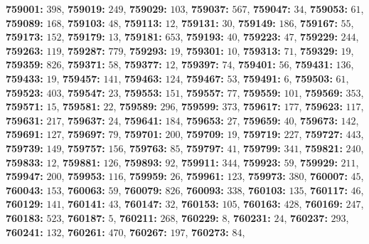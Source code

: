 \textsf{\bfseries 759001:} $398$, \textsf{\bfseries 759019:} $249$, \textsf{\bfseries 759029:} $103$, \textsf{\bfseries 759037:} $567$, \textsf{\bfseries 759047:} $34$, \textsf{\bfseries 759053:} $61$, \textsf{\bfseries 759089:} $168$, \textsf{\bfseries 759103:} $48$, \textsf{\bfseries 759113:} $12$, \textsf{\bfseries 759131:} $30$, \textsf{\bfseries 759149:} $186$, \textsf{\bfseries 759167:} $55$, \textsf{\bfseries 759173:} $152$, \textsf{\bfseries 759179:} $13$, \textsf{\bfseries 759181:} $653$, \textsf{\bfseries 759193:} $40$, \textsf{\bfseries 759223:} $47$, \textsf{\bfseries 759229:} $244$, \textsf{\bfseries 759263:} $119$, \textsf{\bfseries 759287:} $779$, \textsf{\bfseries 759293:} $19$, \textsf{\bfseries 759301:} $10$, \textsf{\bfseries 759313:} $71$, \textsf{\bfseries 759329:} $19$, \textsf{\bfseries 759359:} $826$, \textsf{\bfseries 759371:} $58$, \textsf{\bfseries 759377:} $12$, \textsf{\bfseries 759397:} $74$, \textsf{\bfseries 759401:} $56$, \textsf{\bfseries 759431:} $136$, \textsf{\bfseries 759433:} $19$, \textsf{\bfseries 759457:} $141$, \textsf{\bfseries 759463:} $124$, \textsf{\bfseries 759467:} $53$, \textsf{\bfseries 759491:} $6$, \textsf{\bfseries 759503:} $61$, \textsf{\bfseries 759523:} $403$, \textsf{\bfseries 759547:} $23$, \textsf{\bfseries 759553:} $151$, \textsf{\bfseries 759557:} $77$, \textsf{\bfseries 759559:} $101$, \textsf{\bfseries 759569:} $353$, \textsf{\bfseries 759571:} $15$, \textsf{\bfseries 759581:} $22$, \textsf{\bfseries 759589:} $296$, \textsf{\bfseries 759599:} $373$, \textsf{\bfseries 759617:} $177$, \textsf{\bfseries 759623:} $117$, \textsf{\bfseries 759631:} $217$, \textsf{\bfseries 759637:} $24$, \textsf{\bfseries 759641:} $184$, \textsf{\bfseries 759653:} $27$, \textsf{\bfseries 759659:} $40$, \textsf{\bfseries 759673:} $142$, \textsf{\bfseries 759691:} $127$, \textsf{\bfseries 759697:} $79$, \textsf{\bfseries 759701:} $200$, \textsf{\bfseries 759709:} $19$, \textsf{\bfseries 759719:} $227$, \textsf{\bfseries 759727:} $443$, \textsf{\bfseries 759739:} $149$, \textsf{\bfseries 759757:} $156$, \textsf{\bfseries 759763:} $85$, \textsf{\bfseries 759797:} $41$, \textsf{\bfseries 759799:} $341$, \textsf{\bfseries 759821:} $240$, \textsf{\bfseries 759833:} $12$, \textsf{\bfseries 759881:} $126$, \textsf{\bfseries 759893:} $92$, \textsf{\bfseries 759911:} $344$, \textsf{\bfseries 759923:} $59$, \textsf{\bfseries 759929:} $211$, \textsf{\bfseries 759947:} $200$, \textsf{\bfseries 759953:} $116$, \textsf{\bfseries 759959:} $26$, \textsf{\bfseries 759961:} $123$, \textsf{\bfseries 759973:} $380$, \textsf{\bfseries 760007:} $45$, \textsf{\bfseries 760043:} $153$, \textsf{\bfseries 760063:} $59$, \textsf{\bfseries 760079:} $826$, \textsf{\bfseries 760093:} $338$, \textsf{\bfseries 760103:} $135$, \textsf{\bfseries 760117:} $46$, \textsf{\bfseries 760129:} $141$, \textsf{\bfseries 760141:} $43$, \textsf{\bfseries 760147:} $32$, \textsf{\bfseries 760153:} $105$, \textsf{\bfseries 760163:} $428$, \textsf{\bfseries 760169:} $247$, \textsf{\bfseries 760183:} $523$, \textsf{\bfseries 760187:} $5$, \textsf{\bfseries 760211:} $268$, \textsf{\bfseries 760229:} $8$, \textsf{\bfseries 760231:} $24$, \textsf{\bfseries 760237:} $293$, \textsf{\bfseries 760241:} $132$, \textsf{\bfseries 760261:} $470$, \textsf{\bfseries 760267:} $197$, \textsf{\bfseries 760273:} $84$, 
